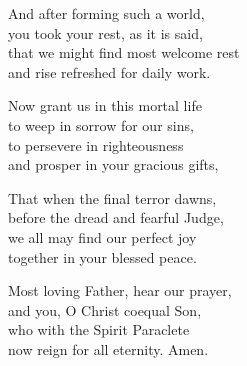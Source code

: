 
And after forming such a world,\\
you took your rest, as it is said,\\
that we might find most welcome rest\\
and rise refreshed for daily work.

Now grant us in this mortal life\\
to weep in sorrow for our sins,\\
to persevere in righteousness\\
and prosper in your gracious gifts,

That when the final terror dawns,\\
before the dread and fearful Judge,\\
we all may find our perfect joy\\
together in your blessed peace.

Most loving Father, hear our prayer,\\
and you, O Christ coequal Son,\\
who with the Spirit Paraclete\\
now reign for all eternity. Amen.